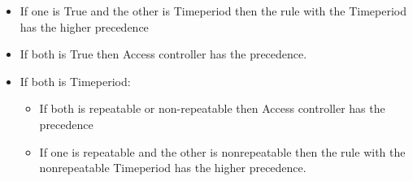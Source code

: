 \begin{itemize}
	\item If one is True and the other is Timeperiod then the rule with the Timeperiod has the higher precedence
	\item If both is True then Access controller has the precedence.
	\item If both is Timeperiod:
		\begin{itemize}
			\item If both is repeatable or non-repeatable then Access controller has the precedence
			\item If one is repeatable and the other is nonrepeatable then the rule with the nonrepeatable Timeperiod has the higher precedence.
		\end{itemize}
\end{itemize}

